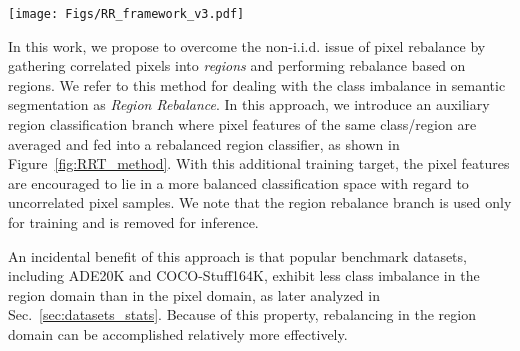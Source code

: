 \documentclass[final]{cvpr}
\begin{document}
\begin{figure*}[t]
	\begin{center}
		\texttt{[image: Figs/RR\_framework\_v3.pdf]}
		\caption{\textbf{Illustrating the region rebalance scheme for semantic segmentation:} The region rebalance branch is indicated by the tan-colored box. We introduce the region rebalance branch (w/o any other changes to the semantic segmentation network and pixel classifier) to handle the class imbalance problem during training and remove it during evaluation.}
		\label{fig:RRT_method}
	\end{center}
	\vspace{-0.00in}
\end{figure*}


In this work, we propose to overcome the non-i.i.d. issue of pixel rebalance by gathering correlated pixels into {\em regions} and performing rebalance based on regions. We refer to this method for dealing with the class imbalance in semantic segmentation as \emph{Region Rebalance}. In this approach, we introduce an auxiliary region classification branch where pixel features of the same class/region are averaged and fed into a rebalanced region classifier, as shown in Figure~\ref{fig:RRT_method}. With this additional training target, the pixel features are encouraged to lie in a more balanced classification space with regard to uncorrelated pixel samples. We note that the region rebalance branch is used only for training and is removed for inference.

An incidental benefit of this approach is that popular benchmark datasets, including ADE20K and COCO-Stuff164K, exhibit less class imbalance in the region domain than in the pixel domain, as later analyzed in Sec.~\ref{sec:datasets_stats}. Because of this property, rebalancing in the region domain can be accomplished relatively more effectively.
\end{document}
